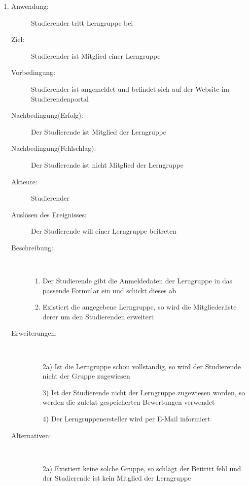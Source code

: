\documentclass[parskip=full]{scrartcl}
\newcommand{\swtLabel}[1]{\textbf{\textbackslash #1\arabic*0\textbackslash}}
\begin{document}
\begin{enumerate}[label=\swtLabel{S}]
  
  \item
  \begin{description}
  \item[Anwendung:] Studierender tritt Lerngruppe bei
  \item[Ziel:] Studierender ist Mitglied einer Lerngruppe
  	\item[Vorbedingung:] Studierender ist angemeldet und befindet sich auf der
  	Website im Studierendenportal
  	\item[Nachbedingung(Erfolg):] Der Studierende ist Mitglied der Lerngruppe
  	\item[Nachbedingung(Fehlschlag):] Der Studierende ist nicht Mitglied der
  	Lerngruppe
  	\item[Akteure:] Studierender
  	\item[Auslösen des Ereignisses:] Der Studierende will einer Lerngruppe beitreten
  	\item[Beschreibung:]~
  	\begin{enumerate}
  	  \item Der Studierende gibt die Anmeldedaten der Lerngruppe in das passende
  	  Formular ein und schickt dieses ab
  	  \item Existiert die angegebene Lerngruppe, so wird die Mitgliederliste
  	  derer um den Studierenden erweitert
  	\end{enumerate}
  	\item[Erweiterungen:]~
  	\begin{enumerate}
  	  \item[2a)] Ist die Lerngruppe schon vollständig, so wird der Studierende nicht
  	  der Gruppe zugewiesen
  	  \item[3)] Ist der Studierende nicht der Lerngruppe zugewiesen worden, so werden
  	  die zuletzt gespeicherten Bewertungen verwendet
  	  \item[4)] Der Lerngruppenersteller wird per E-Mail informiert
  	 \end{enumerate}
  	\item[Alternativen:] ~
  	\begin{enumerate}
  	  \item[2a)] Existiert keine solche Gruppe, so schlägt der Beitritt fehl und
  	  der Studierende ist kein Mitglied der Lerngruppe
  	 \end{enumerate}  
  \end{description}
%   
  

\end{enumerate}
\end{document}
